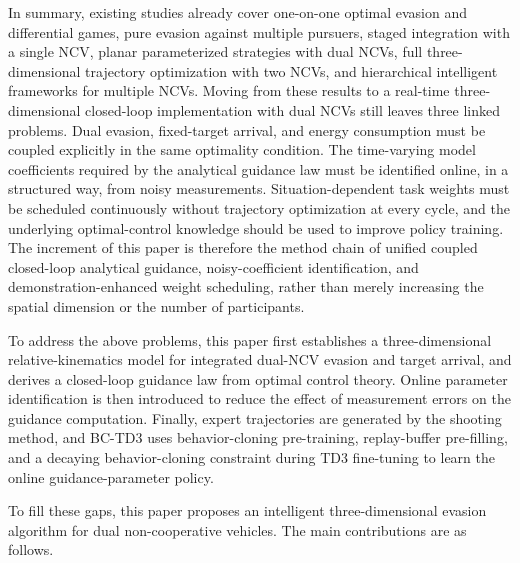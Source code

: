 In summary, existing studies already cover one-on-one optimal evasion and differential games, pure evasion against multiple pursuers, staged integration with a single NCV, planar parameterized strategies with dual NCVs, full three-dimensional trajectory optimization with two NCVs, and hierarchical intelligent frameworks for multiple NCVs. Moving from these results to a real-time three-dimensional closed-loop implementation with dual NCVs still leaves three linked problems. Dual evasion, fixed-target arrival, and energy consumption must be coupled explicitly in the same optimality condition. The time-varying model coefficients required by the analytical guidance law must be identified online, in a structured way, from noisy measurements. Situation-dependent task weights must be scheduled continuously without trajectory optimization at every cycle, and the underlying optimal-control knowledge should be used to improve policy training. The increment of this paper is therefore the method chain of unified coupled closed-loop analytical guidance, noisy-coefficient identification, and demonstration-enhanced weight scheduling, rather than merely increasing the spatial dimension or the number of participants.

To address the above problems, this paper first establishes a three-dimensional relative-kinematics model for integrated dual-NCV evasion and target arrival, and derives a closed-loop guidance law from optimal control theory. Online parameter identification is then introduced to reduce the effect of measurement errors on the guidance computation. Finally, expert trajectories are generated by the shooting method, and BC-TD3 uses behavior-cloning pre-training, replay-buffer pre-filling, and a decaying behavior-cloning constraint during TD3 fine-tuning to learn the online guidance-parameter policy.

To fill these gaps, this paper proposes an intelligent three-dimensional evasion algorithm for dual non-cooperative vehicles. The main contributions are as follows.

